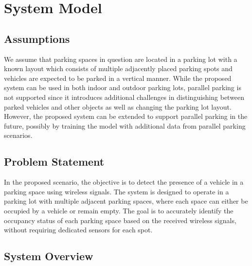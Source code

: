 \section{System Model}
\label{sec:problem}

\subsection{Assumptions}
We assume that parking spaces in question are located in a parking lot with a known layout which consists of multiple adjacently placed parking spots and vehicles are expected to be parked in a vertical manner. While the proposed system can be used in both indoor and outdoor parking lots, parallel parking is not supported since it introduces additional challenges in distinguishing between parked vehicles and other objects as well as changing the parking lot layout. However, the proposed system can be extended to support parallel parking in the future, possibly by training the model with additional data from parallel parking scenarios.

\subsection{Problem Statement}
In the proposed scenario, the objective is to detect the presence of a vehicle in a parking space using wireless signals. The system is designed to operate in a parking lot with multiple adjacent parking spaces, where each space can either be occupied by a vehicle or remain empty. The goal is to accurately identify the occupancy status of each parking space based on the received wireless signals, without requiring dedicated sensors for each spot. 

\subsection{System Overview}

